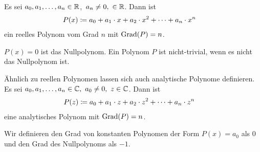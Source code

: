 \thispagestyle{pagenumberonly}

\begin{definition}
    Es sei $a_0,a_1, \dots, a_n\in\mathbb{R}$,~$a_n \neq 0,~\in\mathbb{R}$. Dann ist
    \begin{align*}
        P(x) &\coloneqq a_0 + a_1 \cdot x + a_2 \cdot x^2 + \dots + a_n \cdot x^n
    \end{align*}
    ein reelles Polynom vom Grad $n$ mit $\operatorname{Grad}(P) = n$.
\end{definition}

\begin{definition}[Nullpolynom]
    $P(x) = 0$ ist das Nullpolynom. Ein Polynom $P$ ist nicht-trivial, wenn es nicht das Nullpolynom ist.
\end{definition}

\begin{bemerkung}
    Ähnlich zu reellen Polynomen lassen sich auch analytische Polynome definieren. Es sei $a_0, a_1, \dots, a_n \in\mathbb{C},~a_0\neq 0,~z\in\mathbb{C}$. Dann ist
    \begin{align*}
        P(z) &\coloneqq a_0 + a_1\cdot z + a_2\cdot z^2 + \dots + a_n\cdot z^n
    \end{align*}
    eine analytisches Polynom mit $\operatorname{Grad}(P) = n$.
\end{bemerkung}

\begin{definition}
    Wir definieren den Grad von konstanten Polynomen der Form $P(x) = a_0$ als 0 und den Grad des Nullpolynoms als $-1$.
\end{definition}

